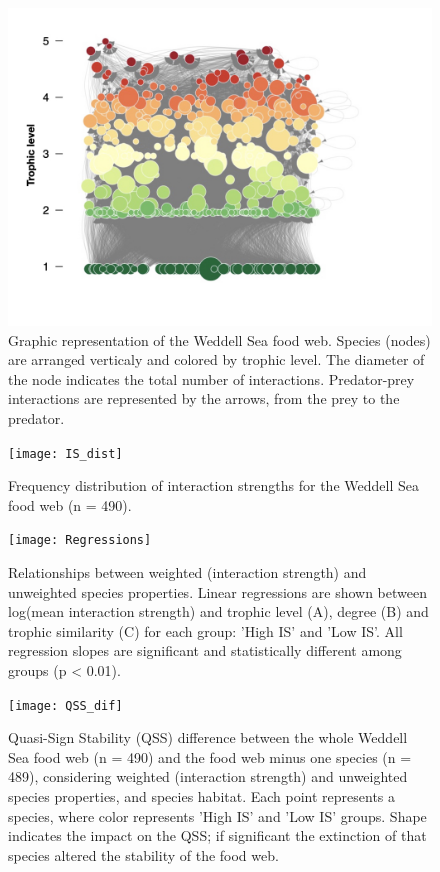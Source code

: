 \documentclass[gc, manuscript]{copernicus}
\begin{document}
\begin{figure}
\includegraphics[width=12cm]{WeddellSea_net} \caption{Graphic representation of the Weddell Sea food web. Species (nodes) are arranged verticaly and colored by trophic level. The diameter of the node indicates the total number of interactions. Predator-prey interactions are represented by the arrows, from the prey to the predator.}\label{fig:unnamed-chunk-3}
\end{figure}

\clearpage

\begin{figure}
\texttt{[image: IS\_dist]} \caption{Frequency distribution of interaction strengths for the Weddell Sea food web (n = 490).}\label{fig:unnamed-chunk-4}
\end{figure}

\clearpage

\begin{figure}
\texttt{[image: Regressions]} \caption{Relationships between weighted (interaction strength) and unweighted species properties. Linear regressions are shown between log(mean interaction strength) and trophic level (A), degree (B) and trophic similarity (C) for each group: 'High IS' and 'Low IS'. All regression slopes are significant and statistically different among groups (p < 0.01).}\label{fig:unnamed-chunk-5}
\end{figure}

\clearpage

\begin{figure}
\texttt{[image: QSS\_dif]} \caption{Quasi-Sign Stability (QSS) difference between the whole Weddell Sea food web (n = 490) and the food web minus one species (n = 489), considering weighted (interaction strength) and unweighted species properties, and species habitat. Each point represents a species, where color represents 'High IS' and 'Low IS' groups. Shape indicates the impact on the QSS; if significant the extinction of that species altered the stability of the food web.}\label{fig:unnamed-chunk-6}
\end{figure}
\end{document}
